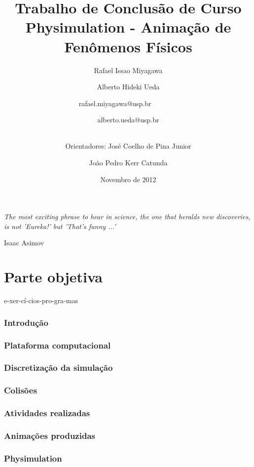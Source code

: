 \documentclass[a4paper,12pt,titlepage]{article}
\title{Trabalho de Conclusão de Curso \\
Physimulation - Animação de Fenômenos Físicos}
\author{Rafael Issao Miyagawa \and Alberto Hideki Ueda \and
	{\small rafael.miyagawa@usp.br \ \ \ \ \ \ \ } \and {\small alberto.ueda@usp.br} \\ \ \and    
	Orientadores: José Coelho de Pina Junior \and  João Pedro Kerr Catunda }
\date{Novembro de 2012}
\begin{document}
\maketitle

\vspace*{\fill}
\epigraph{\it The most exciting phrase to hear in science, the one that heralds new discoveries, is not 'Eureka!' but 'That's funny ...'}{Isaac Asimov}
\newpage

\tableofcontents
\pagebreak

\part{Parte objetiva}
e-xer-cí-cios-pro-gra-mas
\section{Introdução} \label{introducao}

\newpage

\section{Plataforma computacional} \label{plataforma}

\newpage

\section{Discretização da simulação} \label{discretizacao}

\newpage

\section{Colisões} \label{colisoes}

\newpage

\section{Atividades realizadas} \label{atividades}

\newpage

\section{Animações produzidas} \label{animacoes}

\newpage

\section{Physimulation} \label{physimulation}

\newpage
\end{document}
